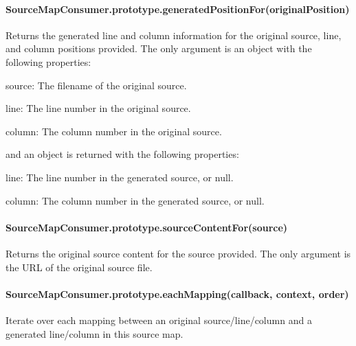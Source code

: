 \paragraph*{Source\+Map\+Consumer.\+prototype.\+generated\+Position\+For(original\+Position)}

Returns the generated line and column information for the original source, line, and column positions provided. The only argument is an object with the following properties\+:


\begin{DoxyItemize}
\item {\ttfamily source}\+: The filename of the original source.
\item {\ttfamily line}\+: The line number in the original source.
\item {\ttfamily column}\+: The column number in the original source.
\end{DoxyItemize}

and an object is returned with the following properties\+:


\begin{DoxyItemize}
\item {\ttfamily line}\+: The line number in the generated source, or null.
\item {\ttfamily column}\+: The column number in the generated source, or null.
\end{DoxyItemize}

\paragraph*{Source\+Map\+Consumer.\+prototype.\+source\+Content\+For(source)}

Returns the original source content for the source provided. The only argument is the U\+R\+L of the original source file.

\paragraph*{Source\+Map\+Consumer.\+prototype.\+each\+Mapping(callback, context, order)}

Iterate over each mapping between an original source/line/column and a generated line/column in this source map.


